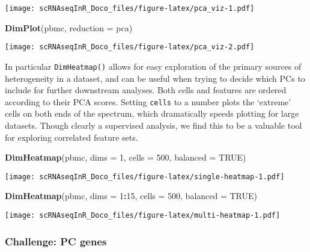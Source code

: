 \documentclass[
]{book}
\newenvironment{Shaded}{\begin{snugshade}}{\end{snugshade}}
\newcommand{\AttributeTok}[1]{\textcolor[rgb]{0.13,0.29,0.53}{#1}}
\newcommand{\ConstantTok}[1]{\textcolor[rgb]{0.56,0.35,0.01}{#1}}
\newcommand{\DecValTok}[1]{\textcolor[rgb]{0.00,0.00,0.81}{#1}}
\newcommand{\FunctionTok}[1]{\textcolor[rgb]{0.13,0.29,0.53}{\textbf{#1}}}
\newcommand{\NormalTok}[1]{#1}
\newcommand{\SpecialCharTok}[1]{\textcolor[rgb]{0.81,0.36,0.00}{\textbf{#1}}}
\newcommand{\StringTok}[1]{\textcolor[rgb]{0.31,0.60,0.02}{#1}}
\begin{document}
\texttt{[image: scRNAseqInR\_Doco\_files/figure-latex/pca\_viz-1.pdf]}

\begin{Shaded}
\begin{Highlighting}[]
\FunctionTok{DimPlot}\NormalTok{(pbmc, }\AttributeTok{reduction =} \StringTok{\textquotesingle{}pca\textquotesingle{}}\NormalTok{)}
\end{Highlighting}
\end{Shaded}

\texttt{[image: scRNAseqInR\_Doco\_files/figure-latex/pca\_viz-2.pdf]}

In particular \texttt{DimHeatmap()} allows for easy exploration of the primary sources of heterogeneity in a dataset, and can be useful when trying to decide which PCs to include for further downstream analyses. Both cells and features are ordered according to their PCA scores. Setting \texttt{cells} to a number plots the `extreme' cells on both ends of the spectrum, which dramatically speeds plotting for large datasets. Though clearly a supervised analysis, we find this to be a valuable tool for exploring correlated feature sets.

\begin{Shaded}
\begin{Highlighting}[]
\FunctionTok{DimHeatmap}\NormalTok{(pbmc, }\AttributeTok{dims =} \DecValTok{1}\NormalTok{, }\AttributeTok{cells =} \DecValTok{500}\NormalTok{, }\AttributeTok{balanced =} \ConstantTok{TRUE}\NormalTok{)}
\end{Highlighting}
\end{Shaded}

\texttt{[image: scRNAseqInR\_Doco\_files/figure-latex/single-heatmap-1.pdf]}

\begin{Shaded}
\begin{Highlighting}[]
\FunctionTok{DimHeatmap}\NormalTok{(pbmc, }\AttributeTok{dims =} \DecValTok{1}\SpecialCharTok{:}\DecValTok{15}\NormalTok{, }\AttributeTok{cells =} \DecValTok{500}\NormalTok{, }\AttributeTok{balanced =} \ConstantTok{TRUE}\NormalTok{)}
\end{Highlighting}
\end{Shaded}

\texttt{[image: scRNAseqInR\_Doco\_files/figure-latex/multi-heatmap-1.pdf]}

\hypertarget{challenge-pc-genes}{%
\subsubsection*{Challenge: PC genes}\label{challenge-pc-genes}}
\end{document}
